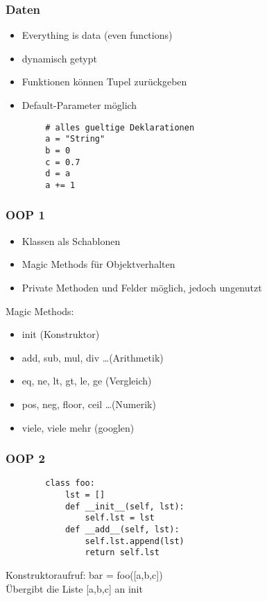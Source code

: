 \documentclass{beamer}
\begin{document}
\begin{frame}[fragile]
	\frametitle{Daten}
	\begin{itemize}
		\item Everything is data (even functions)
		\item dynamisch getypt
		\item Funktionen können Tupel zurückgeben
		\item Default-Parameter möglich
	\end{itemize}
	\pause
	\begin{lstlisting}
		# alles gueltige Deklarationen
		a = "String"
		b = 0
		c = 0.7
		d = a
		a += 1
	\end{lstlisting}
\end{frame}


\begin{frame}
	\frametitle{OOP 1}
	\begin{itemize}
		\item Klassen als Schablonen
		\item Magic Methods für Objektverhalten
		\item Private Methoden und Felder möglich, jedoch ungenutzt
	\end{itemize}
	\pause
	Magic Methods:
	\begin{itemize}
		\item init (Konstruktor)
		\item add, sub, mul, div \dots (Arithmetik)
		\item eq, ne, lt, gt, le, ge (Vergleich)
		\item pos, neg, floor, ceil \dots (Numerik)
		\item viele, viele mehr (googlen)
	\end{itemize}
\end{frame}

\begin{frame}[fragile]
	\frametitle{OOP 2}
	\begin{lstlisting}
		class foo:
			lst = []
		    def __init__(self, lst):
		        self.lst = lst
		    def __add__(self, lst):
		        self.lst.append(lst)
		        return self.lst
	\end{lstlisting}
	Konstruktoraufruf: bar = foo([a,b,c])\\
	Übergibt die Liste [a,b,c] an init
\end{frame}
\end{document}
